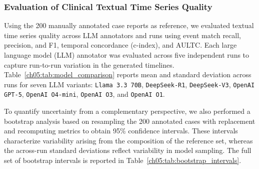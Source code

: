 \subsubsection{Evaluation of Clinical Textual Time Series Quality}
\label{ch05:sec:evaluation-of-tts-quality}

Using the 200 manually annotated case reports as reference, we evaluated textual time series quality across LLM annotators and runs using event match recall, precision, and F1, temporal concordance (c-index), and AULTC.
Each large language model (LLM) annotator was evaluated across five independent runs to capture run-to-run variation in the generated timelines.
Table~\ref{ch05:tab:model_comparison} reports mean and standard deviation across runs for seven LLM variants: \texttt{Llama 3.3 70B}, \texttt{DeepSeek-R1}, \texttt{DeepSeek-V3}, \texttt{OpenAI GPT-5}, \texttt{OpenAI O4-mini}, \texttt{OpenAI O3}, and \texttt{OpenAI O1}.













To quantify uncertainty from a complementary perspective, we also performed a bootstrap analysis based on resampling the 200 annotated cases with replacement and recomputing metrics to obtain 95\% confidence intervals.
These intervals characterize variability arising from the composition of the reference set, whereas the across-run standard deviations reflect variability in model sampling.
The full set of bootstrap intervals is reported in Table~\ref{ch05:tab:bootstrap_intervals}.





